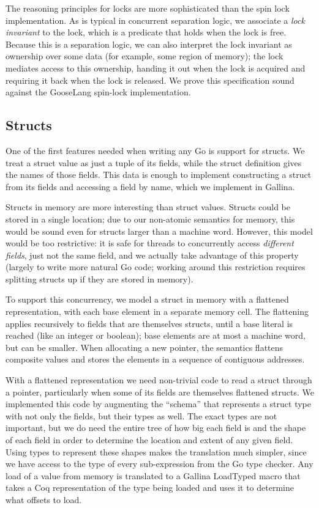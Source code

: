 The reasoning principles for locks are more sophisticated than the spin
lock implementation. As is typical in concurrent separation logic, we
associate a \emph{lock invariant} to the lock, which is a predicate that
holds when the lock is free. Because this is a separation logic, we can
also interpret the lock invariant as ownership over some data (for
example, some region of memory); the lock mediates access to this
ownership, handing it out when the lock is acquired and requiring it
back when the lock is released. We prove this specification sound
against the GooseLang spin-lock implementation.

\subsection{Structs}

One of the first features needed when writing any Go is support for
structs. We treat a struct value as just a tuple of its fields, while
the struct definition gives the names of those fields. This data is
enough to implement constructing a struct from its fields and accessing
a field by name, which we implement in Gallina.

Structs in memory are more interesting than struct values. Structs could
be stored in a single location; due to our non-atomic semantics for
memory, this would be sound even for structs larger than a machine word.
However, this model would be too restrictive: it is safe for threads to
concurrently access \emph{different fields}, just not the same field,
and we actually take advantage of this property (largely to write more
natural Go code; working around this restriction requires splitting
structs up if they are stored in memory).

To support this concurrency, we model a struct in memory with a
flattened representation, with each base element in a separate memory
cell. The flattening applies recursively to fields that are themselves
structs, until a base literal is reached (like an integer or boolean);
base elements are at most a machine word, but can be smaller. When
allocating a new pointer, the semantics flattens composite values and
stores the elements in a sequence of contiguous addresses.

With a flattened representation we need non-trivial code to read a
struct through a pointer, particularly when some of its fields are
themselves flattened structs. We implemented this code by augmenting the
``schema'' that represents a struct type with not only the fields, but
their types as well. The exact types are not important, but we do need
the entire tree of how big each field is and the shape of each field in
order to determine the location and extent of any given field. Using
types to represent these shapes makes the translation much simpler,
since we have access to the type of every sub-expression from the Go
type checker. Any load of a value from memory is translated to a Gallina
LoadTyped macro that takes a Coq representation of the type being loaded
and uses it to determine what offsets to load.

